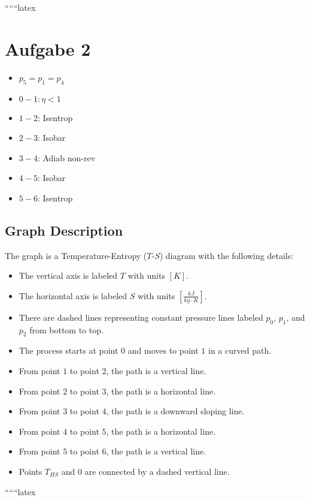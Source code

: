 
``````latex


\section*{Aufgabe 2}

\begin{itemize}
    \item $p_5 = p_1 = p_4$
    \item $0 - 1: \eta < 1$
    \item $1 - 2$: Isentrop
    \item $2 - 3$: Isobar
    \item $3 - 4$: Adiab non-rev
    \item $4 - 5$: Isobar
    \item $5 - 6$: Isentrop
\end{itemize}

\subsection*{Graph Description}

The graph is a Temperature-Entropy ($T$-$S$) diagram with the following details:

\begin{itemize}
    \item The vertical axis is labeled $T$ with units $[K]$.
    \item The horizontal axis is labeled $S$ with units $\left[\frac{kJ}{kg \cdot K}\right]$.
    \item There are dashed lines representing constant pressure lines labeled $p_0$, $p_1$, and $p_2$ from bottom to top.
    \item The process starts at point $0$ and moves to point $1$ in a curved path.
    \item From point $1$ to point $2$, the path is a vertical line.
    \item From point $2$ to point $3$, the path is a horizontal line.
    \item From point $3$ to point $4$, the path is a downward sloping line.
    \item From point $4$ to point $5$, the path is a horizontal line.
    \item From point $5$ to point $6$, the path is a vertical line.
    \item Points $T_{HS}$ and $0$ are connected by a dashed vertical line.
\end{itemize}

``````latex


